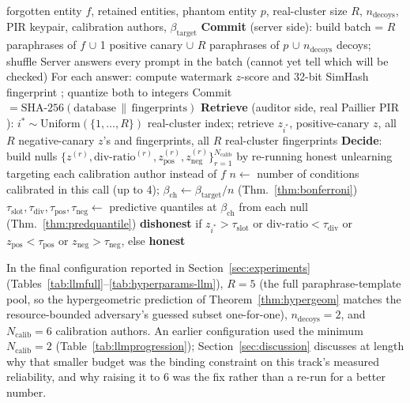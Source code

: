 \documentclass[10pt,journal,compsoc]{IEEEtran}
\begin{document}
\begin{algorithm}[t]
\caption{SEAL-W certificate (auditor side)}
\label{alg:sealw}
\begin{algorithmic}[1]
\REQUIRE forgotten entity $f$, retained entities, phantom entity $p$, real-cluster size $R$, $n_{\text{decoys}}$, PIR keypair, calibration authors, $\beta_{\text{target}}$
\STATE \textbf{Commit} (server side): build batch = $R$ paraphrases of $f$ $\cup$ 1 positive canary $\cup$ $R$ paraphrases of $p$ $\cup$ $n_{\text{decoys}}$ decoys; shuffle
\STATE Server answers every prompt in the batch (cannot yet tell which will be checked)
\STATE For each answer: compute watermark $z$-score \cite{kirchenbauer2023watermark} and 32-bit SimHash fingerprint \cite{charikar2002simhash}; quantize both to integers
\STATE Commit $= \text{SHA-256}(\text{database} \,\|\, \text{fingerprints})$
\STATE \textbf{Retrieve} (auditor side, real Paillier PIR \cite{paillier1999}): $i^\ast \sim \text{Uniform}(\{1,\ldots,R\})$ real-cluster index; retrieve $z_{i^\ast}$, positive-canary $z$, all $R$ negative-canary $z$'s and fingerprints, all $R$ real-cluster fingerprints
\STATE \textbf{Decide}: build nulls $\{z^{(r)}, \text{div-ratio}^{(r)}, z_{\text{pos}}^{(r)}, z_{\text{neg}}^{(r)}\}_{r=1}^{N_{\text{calib}}}$ by re-running honest unlearning targeting each calibration author instead of $f$
\STATE $n \leftarrow$ number of conditions calibrated in this call (up to 4); $\beta_{\text{ch}} \leftarrow \beta_{\text{target}}/n$ (Thm.~\ref{thm:bonferroni})
\STATE $\tau_{\text{slot}}, \tau_{\text{div}}, \tau_{\text{pos}}, \tau_{\text{neg}} \leftarrow$ predictive quantiles at $\beta_{\text{ch}}$ from each null (Thm.~\ref{thm:predquantile})
\RETURN \textbf{dishonest} if $z_{i^\ast}{>}\tau_{\text{slot}}$ or div-ratio${<}\tau_{\text{div}}$ or $z_{\text{pos}}{<}\tau_{\text{pos}}$ or $z_{\text{neg}}{>}\tau_{\text{neg}}$, else \textbf{honest}
\end{algorithmic}
\end{algorithm}

In the final configuration reported in Section~\ref{sec:experiments} (Tables~\ref{tab:llmfull}--\ref{tab:hyperparams-llm}), $R=5$ (the full paraphrase-template pool, so the hypergeometric prediction of Theorem~\ref{thm:hypergeom} matches the resource-bounded adversary's guessed subset one-for-one), $n_{\text{decoys}}=2$, and $N_{\text{calib}}=6$ calibration authors. An earlier configuration used the minimum $N_{\text{calib}}=2$ (Table~\ref{tab:llmprogression}); Section~\ref{sec:discussion} discusses at length why that smaller budget was the binding constraint on this track's measured reliability, and why raising it to 6 was the fix rather than a re-run for a better number.
\end{document}
